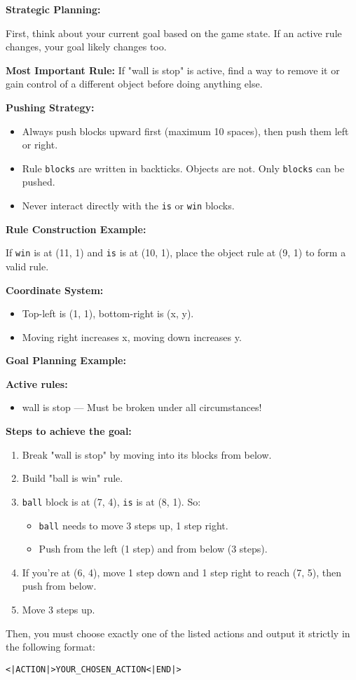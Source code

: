\begin{GreenBox}[frametitle={\textbf{Iteration 3 Baba-is-ai Prompt}}]
\textbf{Strategic Planning:}

First, think about your current goal based on the game state. If an active rule changes, your goal likely changes too.

\textbf{Most Important Rule:}  
If "wall is stop" is active, find a way to remove it or gain control of a different object before doing anything else.

\textbf{Pushing Strategy:}
\begin{itemize}
    \item Always push blocks upward first (maximum 10 spaces), then push them left or right.
    \item Rule \texttt{blocks} are written in backticks. Objects are not. Only \texttt{blocks} can be pushed.
    \item Never interact directly with the \texttt{is} or \texttt{win} blocks.
\end{itemize}

\textbf{Rule Construction Example:}

If \texttt{win} is at (11, 1) and \texttt{is} is at (10, 1), place the object rule at (9, 1) to form a valid rule.

\textbf{Coordinate System:}
\begin{itemize}
    \item Top-left is (1, 1), bottom-right is (x, y).
    \item Moving right increases x, moving down increases y.
\end{itemize}

\textbf{Goal Planning Example:}

\textbf{Active rules:}
\begin{itemize}
    \item wall is stop — Must be broken under all circumstances!
\end{itemize}

\textbf{Steps to achieve the goal:}
\begin{enumerate}
    \item Break "wall is stop" by moving into its blocks from below.
    \item Build "ball is win" rule.
    \item \texttt{ball} block is at (7, 4), \texttt{is} is at (8, 1). So:
    \begin{itemize}
        \item \texttt{ball} needs to move 3 steps up, 1 step right.
        \item Push from the left (1 step) and from below (3 steps).
    \end{itemize}
    \item If you're at (6, 4), move 1 step down and 1 step right to reach (7, 5), then push from below.
    \item Move 3 steps up.
\end{enumerate}

Then, you must choose exactly one of the listed actions and output it strictly in the following format:

\texttt{<|ACTION|>YOUR\_CHOSEN\_ACTION<|END|>}

\end{GreenBox}

